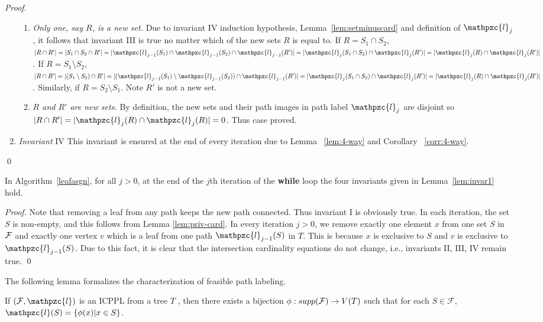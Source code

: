 \documentclass[envcountsect, envcountsame, 11pt]{../lib/llncs2e/llncs}
\def\cF{{\cal F}}
\def\F{{\mathcal F}}
\def\cl{\mathpzc{l}}
\begin{document}
\begin{proof}
\begin{enumerate}[\textreferencemark]
\begin{enumerate}[{III}a $|$]
    \item {\em Only one, say $R$, is a new set.} Due to invariant IV
      induction hypothesis, Lemma~\ref{lem:setminuscard} and
      definition of $\cl_j$, it follows that invariant III is true no
      matter which of the new sets $R$ is equal to. If $R = S_1 \cap
      S_2$, $|R \cap R'| = |S_1 \cap S_2 \cap R'| = |\cl_{j-1}(S_1)
      \cap \cl_{j-1}(S_2) \cap \cl_{j-1}(R')| = |\cl_j(S_1 \cap S_2)
      \cap \cl_j(R')| = |\cl_j(R) \cap \cl_j(R')|$.  If $R = S_1
      \setminus S_2$, $|R \cap R'| = |(S_1 \setminus S_2) \cap R'| =
      |(\cl_{j-1}(S_1) \setminus \cl_{j-1}(S_2)) \cap \cl_{j-1}(R')| =
      |\cl_{j}(S_1 \cap S_2) \cap \cl_{j}(R')| = |\cl_{j}(R) \cap
      \cl_{j}(R')|$. Similarly, if $R = S_2 \setminus
      S_1$. Note $R'$ is not a new set.
    \item {\em $R$ and $R'$ are new sets.} By definition, the new
      sets and their path images in path label $\cl_j$ are disjoint so
      $|R \cap R'| = |\cl_j(R) \cap \cl_j(R)| = 0$. Thus case proved.
    \end{enumerate}
  \item {\em Invariant} IV
    This invariant is ensured at the end of every iteration due to Lemma ~\ref{lem:4-way} and Corollary ~\ref{corr:4-way}.
    \end{enumerate} \qed
\end{proof}
\begin{lemma}
  \label{lem:invar3}
  In Algorithm~\ref{leafasgn}, for all $j > 0$, at the end of the
  $j$th iteration of the {\bf while} loop the four invariants given in
  Lemma~\ref{lem:invar1} hold.
\end{lemma}
\begin{proof}
  Note that removing a leaf from any path keeps the new path
  connected. Thus invariant I is obviously true.  In each iteration, the set $S$ is
  non-empty, and this follows from Lemma \ref{lem:priv-card}.  In every iteration $j
  > 0$, we remove exactly one element $x$ from one set $S$ in $\cF$
  and exactly one vertex $v$ which is a leaf from one path
  $\cl_{j-1}(S)$ in $T$. This is because $x$ is exclusive to $S$ and $v$ is
  exclusive to $\cl_{j-1}(S)$. Due to this fact, it is clear that the
  intersection cardinality equations do not change, i.e., invariants
  II, III, IV remain true.  \qed
\end{proof}
  The following lemma formalizes
the characterization of feasible path labeling.
\begin{lemma}
  \label{lem:hyperiso}  %
  If $(\cF, \cl)$ is an ICPPL from a tree $T$ , then there exists a bijection $\phi :
  supp(\cF) \rightarrow V(T)$ such that for each $S \in \F$, $\cl(S) = \{\phi(x)|x \in S\}$.
\end{lemma}
\end{document}
